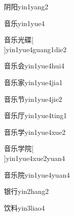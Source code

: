 \begin{verbete*}[6;6]{阴阳}{yin1yang2}
\end{verbete*}

\begin{verbete}[9;5]{音乐}{yin1yue4}
\end{verbete}

\begin{verbete}[9;5;6;14]{音乐光碟}[\\]{yin1yue4guang1die2}
\end{verbete}

\begin{verbete}[9;5;6]{音乐会}{yin1yue4hui4}
\end{verbete}

\begin{verbete}[9;5;10]{音乐家}{yin1yue4jia1}
\end{verbete}

\begin{verbete}[9;5;5]{音乐节}{yin1yue4jie2}
\end{verbete}

\begin{verbete}[9;5;4]{音乐厅}{yin1yue4ting1}
\end{verbete}

\begin{verbete}[9;5;8]{音乐学}{yin1yue4xue2}
\end{verbete}

\begin{verbete}[9;5;8;9]{音乐学院}[\\]{yin1yue4xue2yuan4}
\end{verbete}

\begin{verbete}[9;5;9]{音乐院}{yin1yue4yuan4}
\end{verbete}

\begin{verbete}[11;6]{银行}{yin2hang2}
\end{verbete}

\begin{verbete}[7;10]{饮料}{yin3liao4}
\end{verbete}

